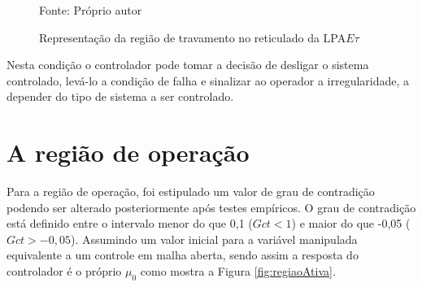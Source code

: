 \begin{figure}[!h]%
\centering
\caption{Representação da região de travamento no reticulado da LPA$E\tau$}
\label{fig:travamentoEixo}

{\small Fonte: Próprio autor }
\end{figure}





Nesta condição o controlador pode tomar a decisão de 
desligar o sistema controlado, 
levá-lo a condição de falha e 
sinalizar ao operador a irregularidade, 
a depender do tipo de sistema a ser controlado.



\section{ A região de operação }

Para a região de operação, 
foi estipulado um valor de grau de contradição
podendo ser alterado posteriormente após testes empíricos.
O grau de contradição está definido entre o intervalo menor do que 0,1 ($Gct < 1$) 
e maior do que -0,05 ($Gct > -0,05$). Assumindo um valor inicial para
a variável manipulada equivalente a um controle em malha aberta, sendo
assim a resposta do controlador é o próprio $\mu_0$ como mostra a
Figura \ref{fig:regiaoAtiva}.





